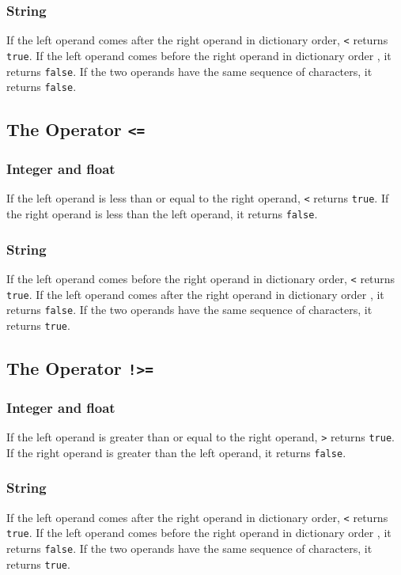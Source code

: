 \subsubsection{String}
If the left operand comes after the right operand in dictionary order, \verb!<! returns \verb!true!. If the left operand comes before the right operand in dictionary order , it returns \verb!false!. If the two operands have the same sequence of characters, it returns \verb!false!.

\subsection{The Operator {\tt <=}}
\subsubsection{Integer and float}
If the left operand is less than or equal to the right operand, \verb!<! returns \verb!true!. If the right operand is less than the left operand, it returns \verb!false!.
\subsubsection{String}
If the left operand comes before the right operand in dictionary order, \verb!<! returns \verb!true!. If the left operand comes after the right operand in dictionary order , it returns \verb!false!. If the two operands have the same sequence of characters, it returns \verb!true!.

\subsection{The Operator {\tt !>=}}
\subsubsection{Integer and float}
If the left operand is greater than or equal to the right operand, \verb!>! returns \verb!true!. If the right operand is greater than the left operand, it returns \verb!false!.
\subsubsection{String}
If the left operand comes after the right operand in dictionary order, \verb!<! returns \verb!true!. If the left operand comes before the right operand in dictionary order , it returns \verb!false!. If the two operands have the same sequence of characters, it returns \verb!true!.
